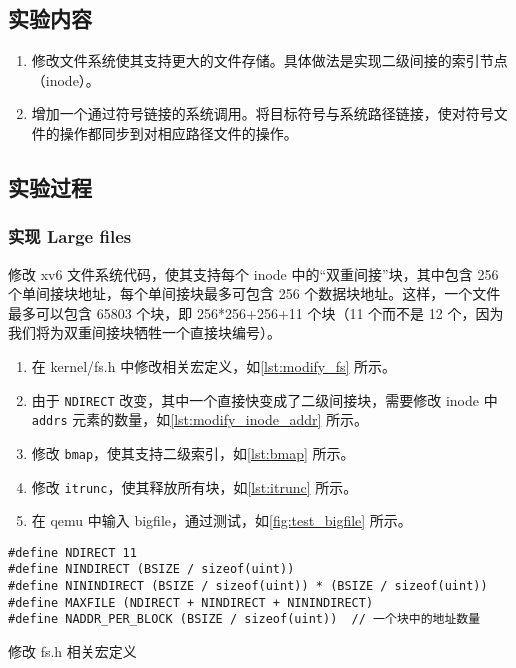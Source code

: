 \subsection{实验内容}

\begin{enumerate}
	\item 修改文件系统使其支持更大的文件存储。具体做法是实现二级间接的索引节点（inode）。
	\item 增加一个通过符号链接的系统调用。将目标符号与系统路径链接，使对符号文件的操作都同步到对相应路径文件的操作。
\end{enumerate}

\subsection{实验过程}

\subsubsection{实现 Large files}

修改 xv6 文件系统代码，使其支持每个 inode 中的“双重间接”块，其中包含 256 个单间接块地址，每个单间接块最多可包含 256 个数据块地址。这样，一个文件最多可以包含 65803 个块，即 256*256+256+11 个块（11 个而不是 12 个，因为我们将为双重间接块牺牲一个直接块编号）。

\begin{enumerate}
	\item 在 kernel/fs.h 中修改相关宏定义，如\cref{lst:modify_fs} 所示。
	\item 由于 \texttt{NDIRECT} 改变，其中一个直接快变成了二级间接块，需要修改 inode 中 \texttt{addrs} 元素的数量，如\cref{lst:modify_inode_addr} 所示。
	\item 修改 \texttt{bmap}，使其支持二级索引，如\cref{lst:bmap} 所示。
	\item 修改 \texttt{itrunc}，使其释放所有块，如\cref{lst:itrunc} 所示。
	\item 在 qemu 中输入 bigfile，通过测试，如\cref{fig:test_bigfile} 所示。
\end{enumerate}

\begin{listing}[!htb]
	\begin{verbatim}
#define NDIRECT 11
#define NINDIRECT (BSIZE / sizeof(uint))
#define NININDIRECT (BSIZE / sizeof(uint)) * (BSIZE / sizeof(uint))
#define MAXFILE (NDIRECT + NINDIRECT + NININDIRECT)
#define NADDR_PER_BLOCK (BSIZE / sizeof(uint))  // 一个块中的地址数量
	\end{verbatim}
	\caption{修改 fs.h 相关宏定义}\label{lst:modify_fs}
\end{listing}

